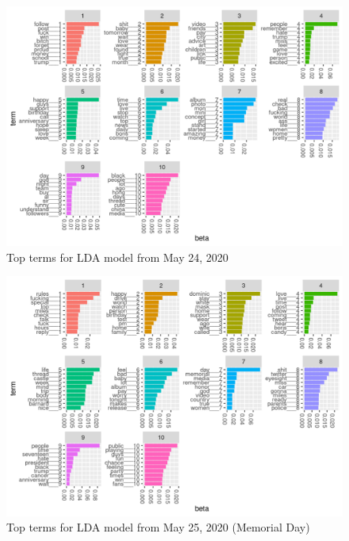 \documentclass[
]{article}
\begin{document}
\begin{figure}
\includegraphics[width=29.17in]{../results/beta-2020-05-24} \caption{Top terms for LDA model from May 24, 2020}\label{fig:may24}
\end{figure}

\begin{figure}
\includegraphics[width=29.17in]{../results/beta-2020-05-25} \caption{Top terms for LDA model from May 25, 2020 (Memorial Day)}\label{fig:may25}
\end{figure}
\end{document}
